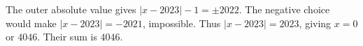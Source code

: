 The outer absolute value gives $|x-2023|-1=\pm2022$. The negative choice would make $|x-2023|=-2021$, impossible. Thus $|x-2023|=2023$, giving $x=0$ or $4046$. Their sum is $\boxed{4046}$.
